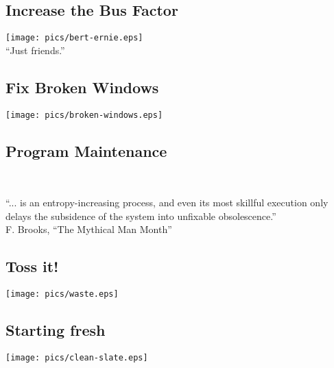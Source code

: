 \documentclass[xga]{xdvislides}
\begin{document}
\subsection{Increase the Bus Factor}
\vspace*{\fill}
\begin{center}
	\texttt{[image: pics/bert-ernie.eps]} \\
	\small
	``Just friends.''
\end{center}
\vspace*{\fill}

\subsection{Fix Broken Windows}
\vspace*{\fill}
\begin{center}
	\texttt{[image: pics/broken-windows.eps]}
\end{center}
\vspace*{\fill}

\subsection{Program Maintenance}
\\
\Huge
\begin{center}
	``... is an entropy-increasing process, and even its most skillful
	execution only delays the subsidence of the system into unfixable
	obsolescence.'' \\
	\addvspace{.2in}
	\small F. Brooks, ``The Mythical Man Month''
\end{center}
\Normalsize

\subsection{Toss it!}
\vspace*{\fill}
\begin{center}
	\texttt{[image: pics/waste.eps]}
\end{center}
\vspace*{\fill}

\subsection{Starting fresh}
\vspace*{\fill}
\begin{center}
	\texttt{[image: pics/clean-slate.eps]}
\end{center}
\vspace*{\fill}
\end{document}
